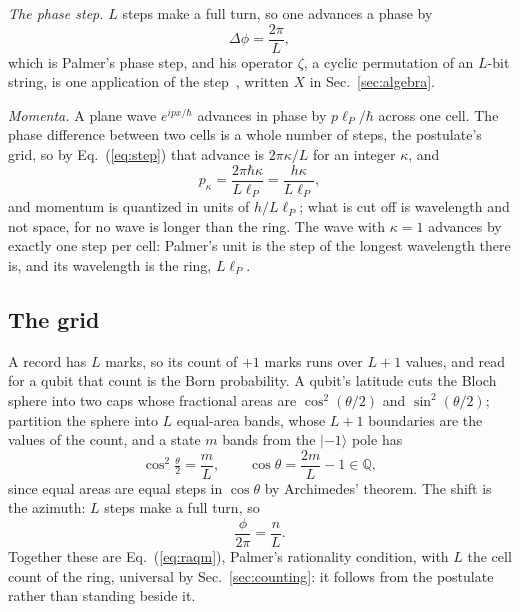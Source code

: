 \documentclass[aps,prd,twocolumn,superscriptaddress,nofootinbib]{revtex4-2}
\begin{document}
\emph{The phase step.} $L$ steps make a full turn, so one advances a phase by
\begin{equation}
\Delta\phi = \frac{2\pi}{L},
\label{eq:step}
\end{equation}
which is Palmer's phase step, and his operator $\zeta$, a cyclic permutation of an $L$-bit string, is one application of the step~\cite{palmer2026}, written $X$ in Sec.~\ref{sec:algebra}.

\emph{Momenta.} A plane wave $e^{ipx/\hbar}$ advances in phase by $p\ell_P/\hbar$ across one cell. The phase difference between two cells is a whole number of steps, the postulate's grid, so by Eq.~(\ref{eq:step}) that advance is $2\pi\kappa/L$ for an integer $\kappa$, and
\begin{equation}
p_\kappa = \frac{2\pi\hbar\kappa}{L\ell_P} = \frac{h\kappa}{L\ell_P},
\label{eq:pquant}
\end{equation}
and momentum is quantized in units of $h/L\ell_P$; what is cut off is wavelength and not space, for no wave is longer than the ring. The wave with $\kappa = 1$ advances by exactly one step per cell: Palmer's unit is the step of the longest wavelength there is, and its wavelength is the ring, $L\ell_P$.

\subsection{The grid}
\label{sec:grid}

A record has $L$ marks, so its count of $+1$ marks runs over $L+1$ values, and read for a qubit that count is the Born probability. A qubit's latitude cuts the Bloch sphere into two caps whose fractional areas are $\cos^2(\theta/2)$ and $\sin^2(\theta/2)$; partition the sphere into $L$ equal-area bands, whose $L+1$ boundaries are the values of the count, and a state $m$ bands from the $|{-1}\rangle$ pole has
\begin{equation}
\cos^2\tfrac{\theta}{2} = \frac{m}{L}, \qquad \cos\theta = \frac{2m}{L} - 1 \in \mathbb{Q},
\label{eq:count}
\end{equation}
since equal areas are equal steps in $\cos\theta$ by Archimedes' theorem. The shift is the azimuth: $L$ steps make a full turn, so
\begin{equation}
\frac{\phi}{2\pi} = \frac{n}{L}.
\label{eq:shift}
\end{equation}
Together these are Eq.~(\ref{eq:raqm}), Palmer's rationality condition, with $L$ the cell count of the ring, universal by Sec.~\ref{sec:counting}: it follows from the postulate rather than standing beside it.
\end{document}
